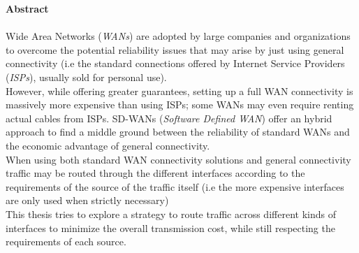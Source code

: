 \pagebreak
\thispagestyle{empty}
\hspace{0pt}
\vfill
\textbf{Abstract} \\
\vspace{0.2cm}
 \\
	Wide Area Networks (\textit{WANs})  are adopted by large companies and organizations to overcome the potential reliability issues that may arise by just using general connectivity (i.e the standard connections offered by Internet Service Providers (\textit{ISPs}), usually sold for personal use). \\
	However, while offering greater guarantees, setting up a full WAN connectivity is massively more expensive than using ISPs; some WANs may even require renting actual cables from ISPs.
	SD-WANs (\textit{Software Defined WAN}) offer an hybrid approach to find a middle ground between the reliability of standard WANs and the economic advantage of general connectivity. \\
	When using both standard WAN connectivity solutions and general connectivity traffic may be routed through the different interfaces according to the requirements of the source of the traffic itself (i.e the more expensive interfaces are only used when strictly necessary) \\
	This thesis tries to explore a strategy to route traffic across different kinds of interfaces to minimize the overall transmission cost, while still respecting the requirements of each source.

\vfill
\hspace{0pt}
\pagebreak